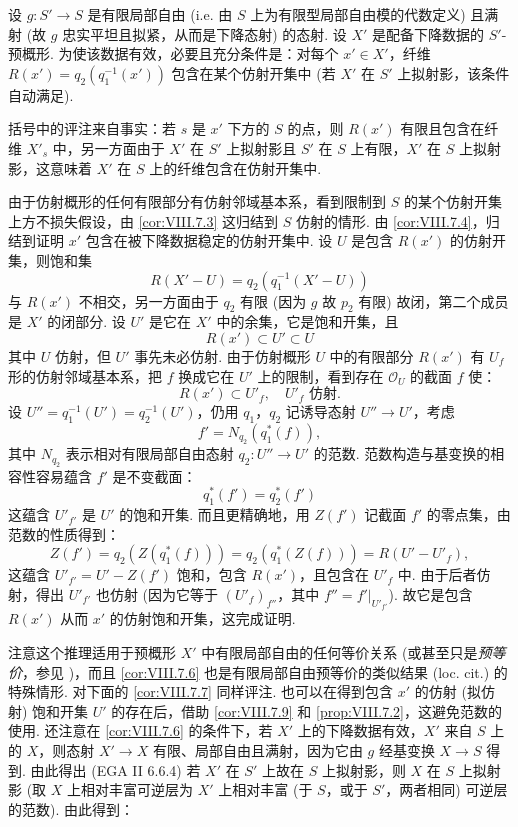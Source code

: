 \begin{corollary}\label{cor:VIII.7.6}
设 $g \colon S' \to S$ 是有限局部自由 (i.e. 由 $S$ 上为有限型局部自由模的代数定义) 且满射 (故 $g$ 忠实平坦且拟紧，从而是下降态射) 的态射. 设 $X'$ 是配备下降数据的 $S'$-预概形. 为使该数据有效，必要且充分条件是：对每个 $x' \in X'$，纤维 $R(x') = q_2(q_1^{-1}(x'))$ 包含在某个仿射开集中 (若 $X'$ 在 $S'$ 上拟射影，该条件自动满足).
\end{corollary}

括号中的评注来自事实：若 $s$ 是 $x'$ 下方的 $S$ 的点，则 $R(x')$ 有限且包含在纤维 $X'_s$ 中，另一方面由于 $X'$ 在 $S'$ 上拟射影且 $S'$ 在 $S$ 上有限，$X'$ 在 $S$ 上拟射影，这意味着 $X'$ 在 $S$ 上的纤维包含在仿射开集中.

由于仿射概形的任何有限部分有仿射邻域基本系，看到限制到 $S$ 的某个仿射开集上方不损失假设，由 \ref{cor:VIII.7.3} 这归结到 $S$ 仿射的情形. 由 \ref{cor:VIII.7.4}，归结到证明 $x'$ 包含在被下降数据稳定的仿射开集中. 设 $U$ 是包含 $R(x')$ 的仿射开集，则饱和集
\[
R(X' - U) = q_2(q_1^{-1}(X' - U))
\]
与 $R(x')$ 不相交，另一方面由于 $q_2$ 有限 (因为 $g$ 故 $p_2$ 有限) 故闭，第二个成员是 $X'$ 的闭部分. 设 $U'$ 是它在 $X'$ 中的余集，它是饱和开集，且
\[
R(x') \subset U' \subset U
\]
其中 $U$ 仿射，但 $U'$ 事先未必仿射. 由于仿射概形 $U$ 中的有限部分 $R(x')$ 有 $U_f$ 形的仿射邻域基本系，把 $f$ 换成它在 $U'$ 上的限制，看到存在 $\mathcal{O}_U$ 的截面 $f$ 使：
\[
R(x') \subset U'_f, \quad U'_f \text{ 仿射}.
\]
设 $U'' = q_1^{-1}(U') = q_2^{-1}(U')$，仍用 $q_1$，$q_2$ 记诱导态射 $U'' \to U'$，考虑
\[
f' = N_{q_2}(q_1^{*}(f)),
\]
其中 $N_{q_2}$ 表示相对有限局部自由态射 $q_2 \colon U'' \to U'$ 的范数. 范数构造与基变换的相容性容易蕴含 $f'$ 是不变截面：
\[
q_1^{*}(f') = q_2^{*}(f')
\]
这蕴含 $U'_{f'}$ 是 $U'$ 的饱和开集. 而且更精确地，用 $Z(f')$ 记截面 $f'$ 的零点集，由范数的性质得到：
\[
Z(f') = q_2(Z(q_1^{*}(f))) = q_2(q_1^{*}(Z(f))) = R(U' - U'_f),
\]
这蕴含 $U'_{f'} = U' - Z(f')$ 饱和，包含 $R(x')$，且包含在 $U'_f$ 中. 由于后者仿射，得出 $U'_{f'}$ 也仿射 (因为它等于 $(U'_f)_{f''}$，其中 $f'' = f'|_{U'_{f'}}$). 故它是包含 $R(x')$ 从而 $x'$ 的仿射饱和开集，这完成证明.

注意这个推理适用于预概形 $X'$ 中有限局部自由的任何等价关系 (或甚至只是\emph{预等价}，参见 \cite{exp08-3})，而且 \ref{cor:VIII.7.6} 也是有限局部自由预等价的类似结果 (loc. cit.) 的特殊情形. 对下面的 \ref{cor:VIII.7.7} 同样评注. 也可以在得到包含 $x'$ 的仿射 (拟仿射) 饱和开集 $U'$ 的存在后，借助 \ref{cor:VIII.7.9} 和 \ref{prop:VIII.7.2}，这避免范数的使用. 还注意在 \ref{cor:VIII.7.6} 的条件下，若 $X'$ 上的下降数据有效，$X'$ 来自 $S$ 上的 $X$，则态射 $X' \to X$ 有限、局部自由且满射，因为它由 $g$ 经基变换 $X \to S$ 得到. 由此得出 (EGA II 6.6.4) 若 $X'$ 在 $S'$ 上故在 $S$ 上拟射影，则 $X$ 在 $S$ 上拟射影 (取 $X$ 上相对丰富可逆层为 $X'$ 上相对丰富 (于 $S$，或于 $S'$，两者相同) 可逆层的范数). 由此得到：

